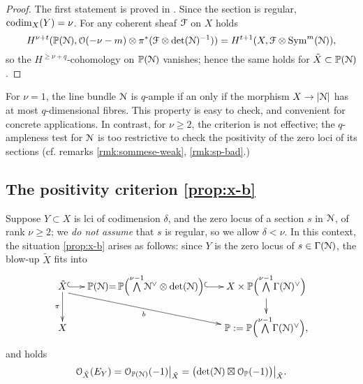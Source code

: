\documentclass[11pt,reqno]{amsart}
\let\euf\EuScript
\let\mbb\mathbb
\let\tld\tilde
\let\srel\stackrel
\numberwithin{equation}{section}
\numberwithin{figure}{section}
\let\ges\geqslant
\begin{document}
\begin{proof}
The first statement is proved in \cite[Theorem 1.4]{mat}. 
Since the section is regular, ${{\rm codim}}_X(Y)=\nu$. 
For any coherent sheaf ${{\euf F}}$ on $X$ holds 
$$
H^{\nu+t}(\mbb P({{\euf N}}),{{\euf O}}(-\nu-m)\otimes\pi^*({{\euf F}}\otimes{{\rm det}}({{\euf N}})^{-1}))
= H^{t+1}(X,{{\euf F}}\otimes{\mathop{\rm Sym}\nolimits}^m({{\euf N}})),
$$
so the $H^{\ges \nu+q}$-cohomology on $\mbb P({{\euf N}})$ vanishes; 
hence the same holds for $\tld X\subset\mbb P({{\euf N}})$. 
\end{proof}

For $\nu=1$, the line bundle ${{\euf N}}$ is $q$-ample if an only if the morphism 
$X\srel{}{\to}|{{\euf N}}|$ has at most $q$-dimensional fibres. 
This property is easy to check, and convenient for concrete applications. 
In contrast, for $\nu\ges 2$, the criterion is not effective; the $q$-ampleness test 
for ${{\euf N}}$ is too restrictive to check the positivity of the zero loci of its sections 
(cf. remarks \ref{rmk:sommese-weak}, \ref{rmk:sp-bad}.) 

\subsection{The positivity criterion \ref{prop:x-b}}\label{ssct:x-b}

Suppose $Y\subset X$ is lci of codimension $\delta$, and the zero locus of a section 
$s$ in ${{\euf N}}$, of rank $\nu\ges 2$; we \emph{do not assume} that $s$ is regular, 
so we allow $\delta<\nu$. 
In this context, the situation \ref{prop:x-b} arises as follows: 
since $Y$ is the zero locus of $s\in\Gamma({{\euf N}})$, the blow-up $\tld X$ fits into 
\begin{equation}\label{eq:tld-x}
\xymatrix@R=1.5em@C=1.5em{
\tld X\ar@{^(->}[r]\ar[d]_-\pi\ar@<-5pt>[rrd]_-b
&
\mbb P({{\euf N}})
{=}\,
\mbb P\Bigl(
\mbox{$\overset{\nu-1}{\bigwedge}$}{{\euf N}}^\vee\otimes{{\rm det}}({{\euf N}})
\Bigr)\ar@{^(->}[r]
&
X\times\mbb P\Bigl(
\mbox{$\overset{\nu-1}{\bigwedge}$}\Gamma({{\euf N}})^\vee
\Bigr)\ar[d]
\\ 
X&&\mbb P:=\mbb P\Bigl(
\mbox{$\overset{\nu-1}{\bigwedge}$}\Gamma({{\euf N}})^\vee
\Bigr),
}
\end{equation}
and holds 
\begin{equation}\label{eq:o1}
{{\euf O}}_{\tld X}(E_Y)={{\euf O}}_{\mbb P({{\euf N}})}(-1)\big|_{\tld X}=
\bigl({{\rm det}}({{\euf N}})\boxtimes{{\euf O}}_{\mbb P}(-1)\bigr)\big|_{\tld X}.
\end{equation}
\end{document}
